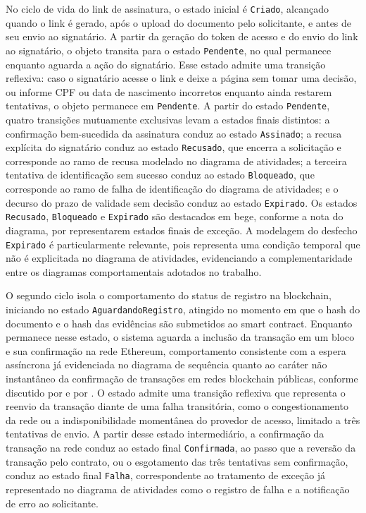 \documentclass[
    12pt,
    a4paper,
    oneside,
    chapter=TITLE,
    section=TITLE,
    subsection=TITLE,
    subsubsection=TITLE,
    sumario=tradicional,
    english,
    brazil
]{abntex2}
\newcommand{\elem}[1]{\texttt{#1}}
\begin{document}
No ciclo de vida do link de assinatura, o estado inicial é \elem{Criado}, alcançado quando o link é gerado, após o upload do documento pelo solicitante, e antes de seu envio ao signatário. A partir da geração do token de acesso e do envio do link ao signatário, o objeto transita para o estado \elem{Pendente}, no qual permanece enquanto aguarda a ação do signatário. Esse estado admite uma transição reflexiva: caso o signatário acesse o link e deixe a página sem tomar uma decisão, ou informe CPF ou data de nascimento incorretos enquanto ainda restarem tentativas, o objeto permanece em \elem{Pendente}. A partir do estado \elem{Pendente}, quatro transições mutuamente exclusivas levam a estados finais distintos: a confirmação bem-sucedida da assinatura conduz ao estado \elem{Assinado}; a recusa explícita do signatário conduz ao estado \elem{Recusado}, que encerra a solicitação e corresponde ao ramo de recusa modelado no diagrama de atividades; a terceira tentativa de identificação sem sucesso conduz ao estado \elem{Bloqueado}, que corresponde ao ramo de falha de identificação do diagrama de atividades; e o decurso do prazo de validade sem decisão conduz ao estado \elem{Expirado}. Os estados \elem{Recusado}, \elem{Bloqueado} e \elem{Expirado} são destacados em bege, conforme a nota do diagrama, por representarem estados finais de exceção. A modelagem do desfecho \elem{Expirado} é particularmente relevante, pois representa uma condição temporal que não é explicitada no diagrama de atividades, evidenciando a complementaridade entre os diagramas comportamentais adotados no trabalho.

O segundo ciclo isola o comportamento do status de registro na blockchain, iniciando no estado \elem{AguardandoRegistro}, atingido no momento em que o hash do documento e o hash das evidências são submetidos ao smart contract. Enquanto permanece nesse estado, o sistema aguarda a inclusão da transação em um bloco e sua confirmação na rede Ethereum, comportamento consistente com a espera assíncrona já evidenciada no diagrama de sequência quanto ao caráter não instantâneo da confirmação de transações em redes blockchain públicas, conforme discutido por  e por . O estado admite uma transição reflexiva que representa o reenvio da transação diante de uma falha transitória, como o congestionamento da rede ou a indisponibilidade momentânea do provedor de acesso, limitado a três tentativas de envio. A partir desse estado intermediário, a confirmação da transação na rede conduz ao estado final \elem{Confirmada}, ao passo que a reversão da transação pelo contrato, ou o esgotamento das três tentativas sem confirmação, conduz ao estado final \elem{Falha}, correspondente ao tratamento de exceção já representado no diagrama de atividades como o registro de falha e a notificação de erro ao solicitante.
\end{document}
